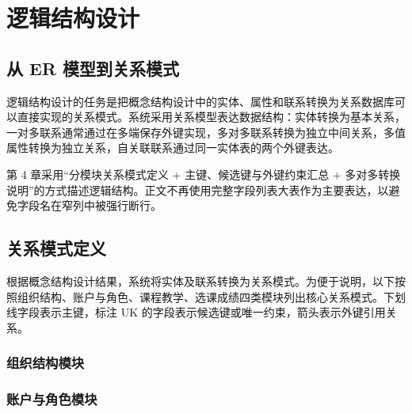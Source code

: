 \chapter{逻辑结构设计}

\section{从 ER 模型到关系模式}

逻辑结构设计的任务是把概念结构设计中的实体、属性和联系转换为关系数据库可以直接实现的关系模式。系统采用关系模型表达数据结构：实体转换为基本关系，一对多联系通常通过在多端保存外键实现，多对多联系转换为独立中间关系，多值属性转换为独立关系，自关联联系通过同一实体表的两个外键表达。

第 4 章采用“分模块关系模式定义 + 主键、候选键与外键约束汇总 + 多对多转换说明”的方式描述逻辑结构。正文不再使用完整字段列表大表作为主要表达，以避免字段名在窄列中被强行断行。

\section{关系模式定义}

根据概念结构设计结果，系统将实体及联系转换为关系模式。为便于说明，以下按照组织结构、账户与角色、课程教学、选课成绩四类模块列出核心关系模式。下划线字段表示主键，标注 UK 的字段表示候选键或唯一约束，箭头表示外键引用关系。

\subsection{组织结构模块}

\begin{description}[leftmargin=0pt,labelindent=0pt,labelwidth=0pt,labelsep=0pt,style=nextline]
    \item[\code{department}]

    \item[\code{major}]
\end{description}

\subsection{账户与角色模块}

